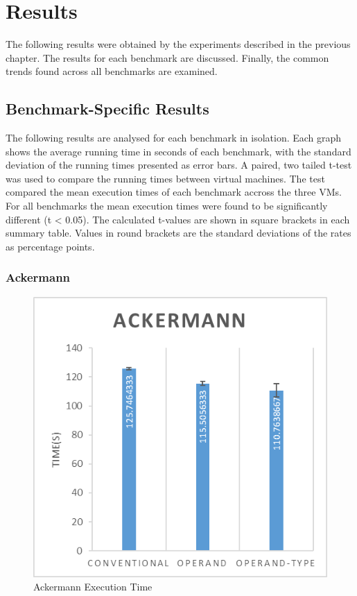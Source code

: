 \documentclass[english,a4paper,12pt]{report}
\begin{document}
\chapter{Results}

The following results were obtained by the experiments described in
the previous chapter. The results for each benchmark are
discussed. Finally, the common trends found across all benchmarks are
examined.

\section{Benchmark-Specific Results}

The following results are analysed for each benchmark in
isolation. Each graph shows the average running time in seconds of
each benchmark, with the standard deviation of the running times
presented as error bars. A paired, two tailed t-test was used to
compare the running times between virtual machines. The test compared
the mean execution times of each benchmark accross the three VMs. For
all benchmarks the mean execution times were found to be significantly
different (t < 0.05). The calculated t-values are shown in square
brackets in each summary table.  Values in round brackets are the
standard deviations of the rates as percentage points.

\subsection{Ackermann}

\begin{figure}[!htb]
  \centering
  \includegraphics{ackermann.png}
  \caption{Ackermann Execution Time}
  \label{fig:ackermann-time}
\end{figure}
\end{document}
